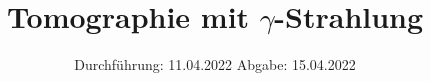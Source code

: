 

\subject{V14}
\title{Tomographie mit $\gamma$-Strahlung}
\date{%
  Durchführung: 11.04.2022
  \hspace{3em}
  Abgabe: 15.04.2022
}



\maketitle
\thispagestyle{empty}
\tableofcontents
\newpage





\nocite{*}
\printbibliography{}


